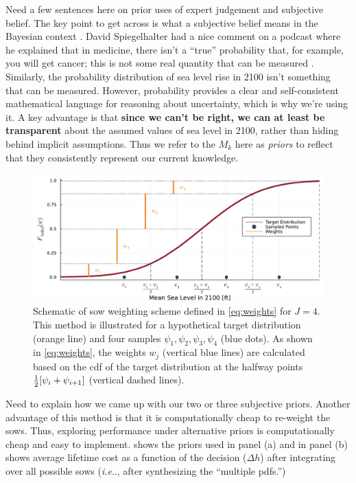 \documentclass[12pt]{article}
\makeatletter
\newcommand{\klaus}[1]{\todo[color=rosso, textcolor=grigio]{\textbf{ATTN Klaus:~}#1}}
\DeclareRobustCommand\onedot{\futurelet\@let@token\@onedot}
\def\@onedot{\ifx\@let@token.\else.\null\fi\xspace}
\def\ie{\emph{i.e}\onedot} \def\Ie{\emph{I.e}\onedot}
\DeclareRobustCommand\onedot{\futurelet\@let@token\@onedot}
\def\@onedot{\ifx\@let@token.\else.\null\fi\xspace}
\def\ie{\emph{i.e}\onedot} \def\Ie{\emph{I.e}\onedot}
\makeatother
\begin{document}
Need a few sentences here on prior uses of expert judgement and subjective belief.
The key point to get across is what a subjective belief means in the Bayesian context \citep{savage:1954,gelman_philosophy:2013,gelman_subjectiveobjective:2017}.
David Spiegelhalter had a nice comment on a podcast where he explained that in medicine, there isn't a ``true'' probability that, for example, you will get cancer; this is not some real quantity that can be measured \citep[hence the famous ``probability isn't real'' admonisment of][]{definetti_probability:1972}.
Similarly, the probability distribution of sea level rise in 2100 isn't something that can be measured.
However, probability provides a clear and self-consistent mathematical language for reasoning about uncertainty, which is why we're using it.
A key advantage is that \textbf{since we can't be right, we can at least be transparent} about the assumed values of sea level in 2100, rather than hiding behind implicit assumptions.
Thus we refer to the $M_k$ here as \emph{priors} to reflect that they consistently represent our current knowledge.

\begin{figure}
    \centering
    \includegraphics[width=\textwidth]{grid-sketch}
    \caption{
        Schematic of \gls{sow} weighting scheme defined in \cref{eq:weights} for $J=4$.
        This method is illustrated for a hypothetical target distribution (orange line) and four samples $\psi_1, \psi_2, \psi_3, \psi_4$ (blue dots).
        As shown in \cref{eq:weights}, the weights $w_j$ (vertical blue lines) are calculated based on the \gls{cdf} of the target distribution at the halfway points $\frac{1}{2}\qty[\psi_i+\psi_{i+1}]$ (vertical dashed lines).
    }\label{fig:grid-sketch}
\end{figure}

Need to explain how we came up with our two or three subjective priors.\klaus{Would love suggestions here!}
Another advantage of this method is that it is computationally cheap to re-weight the \glspl{sow}.
Thus, exploring performance under alternative priors is computationally cheap and easy to implement.
 shows the priors used in panel (a) and in panel (b) shows average lifetime cost as a function of the decision ($\Delta h$) after integrating over all possible \glspl{sow} (\ie, after synthesizing the ``multiple \glspl{pdf}.'')
\end{document}
